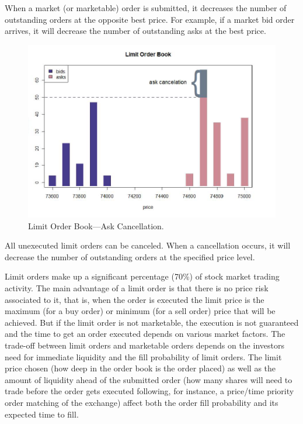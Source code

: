 	
When a market (or marketable) order is submitted, it decreases the number of outstanding orders at the opposite best price. For example, if a market bid order arrives, it will decrease the number of outstanding asks at the best price.
	\begin{figure}[!ht]
	   \centering
	   \includegraphics[width=\textwidth]{chapters/chapter_trading_fund/figures/limitbk3.png} 
	   \caption{Limit Order Book---Ask Cancellation. \label{fig:limbk3}}
	\end{figure}
All unexecuted limit orders can be canceled. When a cancellation occurs, it will decrease the number of outstanding orders at the specified price level.


Limit orders make up a significant percentage (70\%) of stock market trading activity. The main advantage of a limit order is that there is no price risk associated to it, that is, when the order is executed the limit price is the maximum (for a buy order) or minimum (for a sell order) price that will be achieved. But if the limit order is not marketable, the execution is not guaranteed and the time to get an order executed depends on various market factors. The trade-off between limit orders and marketable orders depends on the investors need for immediate liquidity and the fill probability of limit orders. The limit price chosen (how deep in the order book is the order placed) as well as the amount of liquidity ahead of the submitted order (how many shares will need to trade before the order gets executed following, for instance, a price/time priority order matching of the exchange) affect both the order fill probability and its expected time to fill. 


